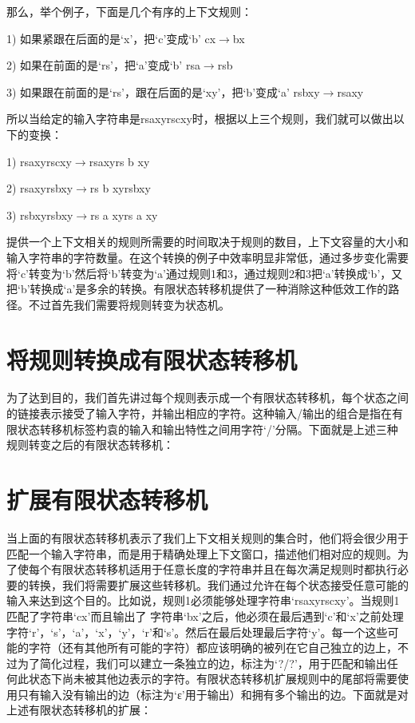 那么，举个例子，下面是几个有序的上下文规则：

1) 	如果紧跟在后面的是‘x’，把‘c’变成‘b’  cx$\rightarrow$bx

2) 	如果在前面的是‘rs’，把‘a’变成‘b’  	 rsa$\rightarrow$rsb

3) 	如果跟在前面的是‘rs’，跟在后面的是‘xy’，把‘b’变成‘a’ rsbxy$\rightarrow$rsaxy

所以当给定的输入字符串是rsaxyrscxy时，根据以上三个规则，我们就可以做出以下的变换：

1) rsaxyrscxy$\rightarrow$rsaxyrs  b  xy

2) rsaxyrsbxy$\rightarrow$rs  b  xyrsbxy

3) rsbxyrsbxy$\rightarrow$rs  a  xyrs  a  xy

提供一个上下文相关的规则所需要的时间取决于规则的数目，上下文容量的大小和输入字符串的字符数量。在这个转换的例子中效率明显非常低，通过多步变化需要将‘c’转变为‘b’然后将‘b’转变为‘a’通过规则1和3，通过规则2和3把‘a’转换成‘b’，又把‘b’转换成‘a’是多余的转换。有限状态转移机提供了一种消除这种低效工作的路径。不过首先我们需要将规则转变为状态机。
\section{将规则转换成有限状态转移机}
为了达到目的，我们首先讲过每个规则表示成一个有限状态转移机，每个状态之间的链接表示接受了输入字符，并输出相应的字符。这种输入/输出的组合是指在有限状态转移机标签杓袁的输入和输出特性之间用字符‘/’分隔。下面就是上述三种规则转变之后的有限状态转移机：


\section{扩展有限状态转移机}
当上面的有限状态转移机表示了我们上下文相关规则的集合时，他们将会很少用于匹配一个输入字符串，而是用于精确处理上下文窗口，描述他们相对应的规则。为了使每个有限状态转移机适用于任意长度的字符串并且在每次满足规则时都执行必要的转换，我们将需要扩展这些转移机。我们通过允许在每个状态接受任意可能的输入来达到这个目的。比如说，规则1必须能够处理字符串‘rsaxyrscxy’。当规则1匹配了字符串‘cx’而且输出了 字符串‘bx’之后，他必须在最后遇到‘c’和‘x’之前处理字符‘r’，‘s’，‘a’，‘x’，‘y’，‘r’和‘s’。然后在最后处理最后字符‘y’。每一个这些可能的字符（还有其他所有可能的字符）都应该明确的被列在它自己独立的边上，不过为了简化过程，我们可以建立一条独立的边，标注为‘?/?’，用于匹配和输出任何此状态下尚未被其他边表示的字符。有限状态转移机扩展规则中的尾部将需要使用只有输入没有输出的边（标注为‘ε’用于输出）和拥有多个输出的边。下面就是对上述有限状态转移机的扩展：

